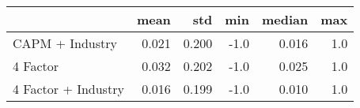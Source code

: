 \begin{tabular}{lrrrrr}
\toprule
{} &   mean &    std &  min &  median &  max \\
\midrule
 CAPM + Industry    &  0.021 &  0.200 & -1.0 &   0.016 &  1.0 \\
4 Factor            &  0.032 &  0.202 & -1.0 &   0.025 &  1.0 \\
4 Factor + Industry &  0.016 &  0.199 & -1.0 &   0.010 &  1.0 \\
\bottomrule
\end{tabular}
